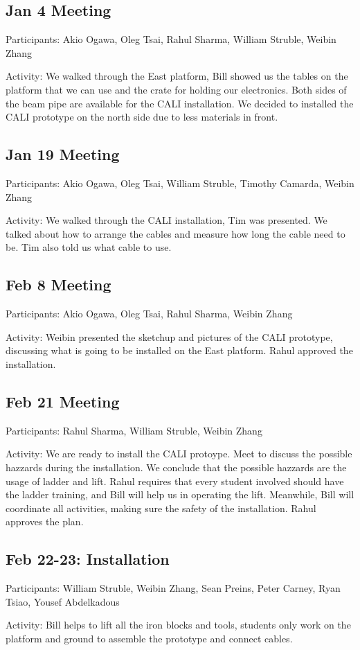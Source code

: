 \documentclass[a4paper, 12pt]{report}
\begin{document}
\subsection{Jan 4 Meeting}
Participants: Akio Ogawa, Oleg Tsai, Rahul Sharma, William Struble,  Weibin Zhang

Activity: We walked through the East platform, Bill showed us the tables on the 
platform that we can use and the crate for holding our electronics. 
Both sides of the beam pipe are available for the CALI installation. 
We decided to installed the CALI prototype on the north side due to less materials in front.

\subsection{Jan 19 Meeting}
Participants: Akio Ogawa, Oleg Tsai, William Struble, Timothy Camarda,  Weibin Zhang

Activity: We walked through the CALI installation, Tim was presented. We talked
about how to arrange the cables and measure how long the cable need to be. Tim
also told us what cable to use.

\subsection{Feb 8 Meeting}
Participants: Akio Ogawa, Oleg Tsai, Rahul Sharma, Weibin Zhang

Activity: Weibin presented the sketchup and pictures of the CALI prototype, discussing
what is going to be installed on the East platform. Rahul approved the installation.

\subsection{Feb 21 Meeting}
Participants: Rahul Sharma, William Struble, Weibin Zhang

Activity: We are ready to install the CALI protoype. Meet to discuss the possible
hazzards during the installation. We conclude that the possible hazzards are the usage
of ladder and lift. Rahul requires that every student involved should have the
ladder training, and Bill will help us in operating the lift. Meanwhile, Bill will
coordinate all activities, making sure the safety of the installation. Rahul approves
the plan.

\subsection{Feb 22-23: Installation}
Participants: William Struble, Weibin Zhang, Sean Preins, Peter Carney, Ryan Tsiao, Yousef Abdelkadous

Activity: Bill helps to lift all the iron blocks and tools, students only work on the platform and ground
to assemble the prototype and connect cables.
\end{document}
